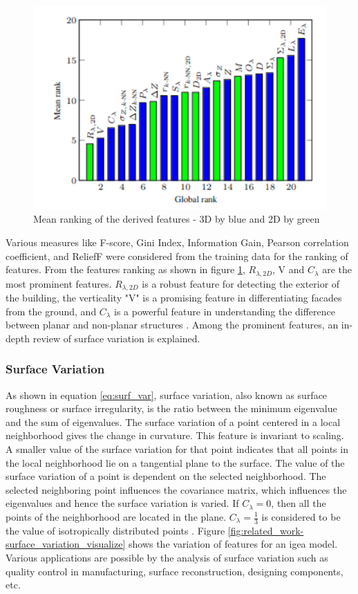 \begin{figure}[htbp]
    \centering
    \includegraphics[width=0.8\linewidth]{97_graphics/related_work/geometric_features_ranking.pdf}
    \caption{Mean ranking of the derived features - 3D by blue and 2D by green \parencite{weinmann2013feature}}
    \label{fig:realted_work-3dgeo_feature_assessment}
\end{figure}
Various measures like F-score, Gini Index, Information Gain, Pearson correlation coefficient, and ReliefF were considered from the training data for the ranking of features. From the features ranking as shown in figure \ref{fig:realted_work-3dgeo_feature_assessment}, \( R_{\lambda,2D} \), V and \(C_{\lambda} \) are the most prominent features. \( R_{\lambda,2D} \) is a robust feature for detecting the exterior of the building, the verticality "V" is a promising feature in differentiating facades from the ground, and \(C_{\lambda} \) is a powerful feature in understanding the difference between planar and non-planar structures \parencite{weinmann2013feature}. Among the prominent features, an in-depth review of surface variation is explained.

\subsubsection{Surface Variation}
As shown in equation \ref{eq:surf_var}, surface variation, also known as surface roughness or surface irregularity, is the ratio between the minimum eigenvalue and the sum of eigenvalues. The surface variation of a point centered in a local neighborhood gives the change in curvature. This feature is invariant to scaling. A smaller value of the surface variation for that point indicates that all points in the local neighborhood lie on a tangential plane to the surface. The value of the surface variation of a point is dependent on the selected neighborhood. The selected neighboring point influences the covariance matrix, which influences the eigenvalues and hence the surface variation is varied. If 
\(C_{\lambda} = 0 \), then all the points of the neighborhood are located in the plane. \(C_{\lambda} = \frac{1}{3} \) is considered to be the value of isotropically distributed points \parencite{pauly2002efficient}. Figure \ref{fig:related_work-surface_variation_visualize} shows the variation of features for an igea model. Various applications are possible by the analysis of surface variation such as quality control in manufacturing, surface reconstruction, designing components, etc.

